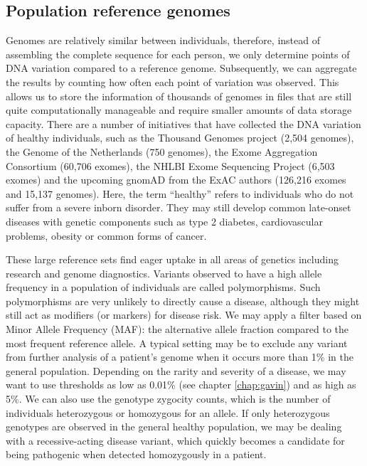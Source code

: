 \subsection{Population reference genomes}
Genomes are relatively similar between individuals, therefore, instead of assembling the complete sequence for each person, we only determine points of DNA variation compared to a reference genome.
Subsequently, we can aggregate the results by counting how often each point of variation was observed.
This allows us to store the information of thousands of genomes in files that are still quite computationally manageable and require smaller amounts of data storage capacity.
There are a number of initiatives that have collected the DNA variation of healthy individuals, such as the Thousand Genomes project\cite{McVean_2012} (2,504 genomes), the Genome of the Netherlands\cite{Francioli_2014} (750 genomes), the Exome Aggregation Consortium\cite{Lek_2016} (60,706 exomes), the NHLBI Exome Sequencing Project\cite{EVS} (6,503 exomes) and the upcoming gnomAD from the ExAC authors\cite{Lek_2016} (126,216 exomes and 15,137 genomes).
Here, the term “healthy” refers to individuals who do not suffer from a severe inborn disorder.
They may still develop common late-onset diseases with genetic components such as type 2 diabetes, cardiovascular problems, obesity or common forms of cancer.

These large reference sets find eager uptake in all areas of genetics including research and genome diagnostics.
Variants observed to have a high allele frequency in a population of individuals are called polymorphisms.
Such polymorphisms are very unlikely to directly cause a disease, although they might still act as modifiers (or markers) for disease risk\cite{Donald_2017}.
We may apply a filter based on Minor Allele Frequency (MAF): the alternative allele fraction compared to the most frequent reference allele.
A typical setting may be to exclude any variant from further analysis of a patient's genome when it occurs more than 1\% in the general population.
Depending on the rarity and severity of a disease, we may want to use thresholds as low as 0.01\% (see chapter \ref{chap:gavin}) and as high as 5\%\cite{Strom_2011}.
We can also use the genotype zygocity counts, which is the number of individuals heterozygous or homozygous for an allele.
If only heterozygous genotypes are observed in the general healthy population, we may be dealing with a recessive-acting disease variant, which quickly becomes a candidate for being pathogenic when detected homozygously in a patient.

